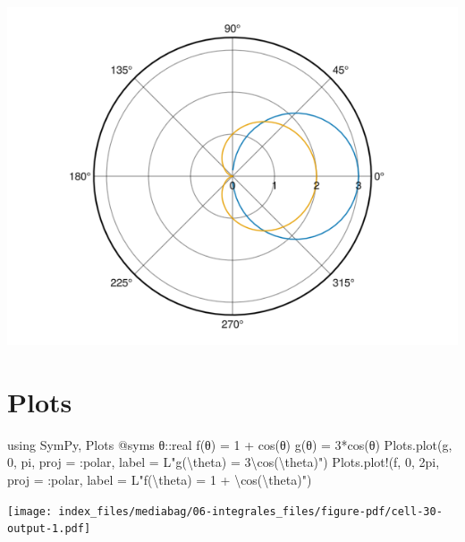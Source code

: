 \documentclass[
  a4paper,
]{scrreport}
\newenvironment{Shaded}{\begin{snugshade}}{\end{snugshade}}
\newcommand{\BuiltInTok}[1]{\textcolor[rgb]{0.00,0.23,0.31}{#1}}
\newcommand{\ConstantTok}[1]{\textcolor[rgb]{0.56,0.35,0.01}{#1}}
\newcommand{\DataTypeTok}[1]{\textcolor[rgb]{0.68,0.00,0.00}{#1}}
\newcommand{\FloatTok}[1]{\textcolor[rgb]{0.68,0.00,0.00}{#1}}
\newcommand{\FunctionTok}[1]{\textcolor[rgb]{0.28,0.35,0.67}{#1}}
\newcommand{\ImportTok}[1]{\textcolor[rgb]{0.00,0.46,0.62}{#1}}
\newcommand{\NormalTok}[1]{\textcolor[rgb]{0.00,0.23,0.31}{#1}}
\newcommand{\OperatorTok}[1]{\textcolor[rgb]{0.37,0.37,0.37}{#1}}
\newcommand{\PreprocessorTok}[1]{\textcolor[rgb]{0.68,0.00,0.00}{#1}}
\newcommand{\SpecialCharTok}[1]{\textcolor[rgb]{0.37,0.37,0.37}{#1}}
\newcommand{\StringTok}[1]{\textcolor[rgb]{0.13,0.47,0.30}{#1}}
\theoremstyle{definition}
\theoremstyle{remark}
\begin{document}
\begin{tcolorbox}
\includegraphics{06-integrales_files/figure-pdf/cell-29-output-1.png}

\section{Plots}

\begin{Shaded}
\begin{Highlighting}[]
\ImportTok{using} \BuiltInTok{SymPy}\NormalTok{, }\BuiltInTok{Plots}
\PreprocessorTok{@syms}\NormalTok{ θ}\OperatorTok{::}\DataTypeTok{real}
\FunctionTok{f}\NormalTok{(θ) }\OperatorTok{=} \FloatTok{1} \OperatorTok{+} \FunctionTok{cos}\NormalTok{(θ)}
\FunctionTok{g}\NormalTok{(θ) }\OperatorTok{=} \FloatTok{3}\FunctionTok{*cos}\NormalTok{(θ)}
\NormalTok{Plots.}\FunctionTok{plot}\NormalTok{(g, }\FloatTok{0}\NormalTok{, }\ConstantTok{pi}\NormalTok{, proj }\OperatorTok{=} \OperatorTok{:}\NormalTok{polar, label }\OperatorTok{=}\NormalTok{ L}\StringTok{"g(}\SpecialCharTok{\textbackslash{}t}\StringTok{heta) = 3\textbackslash{}cos(}\SpecialCharTok{\textbackslash{}t}\StringTok{heta)"}\NormalTok{)}
\NormalTok{Plots.}\FunctionTok{plot!}\NormalTok{(f, }\FloatTok{0}\NormalTok{, }\FloatTok{2}\NormalTok{pi, proj }\OperatorTok{=} \OperatorTok{:}\NormalTok{polar, label }\OperatorTok{=}\NormalTok{ L}\StringTok{"f(}\SpecialCharTok{\textbackslash{}t}\StringTok{heta) = 1 + \textbackslash{}cos(}\SpecialCharTok{\textbackslash{}t}\StringTok{heta)"}\NormalTok{)}
\end{Highlighting}
\end{Shaded}

\texttt{[image: index\_files/mediabag/06-integrales\_files/figure-pdf/cell-30-output-1.pdf]}


\end{tcolorbox}
\end{document}
